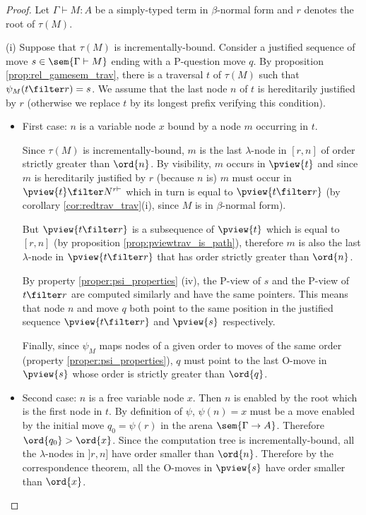 \begin{proof}
Let $\Gamma \vdash M : A$ be a simply-typed term in $\beta$-normal
form and $r$ denotes the root of $\tau(M)$.

\noindent (i) Suppose that $\tau(M)$ is incrementally-bound.
Consider a justified sequence of move $s \in \sem{\Gamma \vdash M}$
ending with a P-question move $q$. By proposition \ref{prop:rel_gamesem_trav},
there is a traversal $t$ of $\tau(M)$ such that $\psi_M (t\filter r) = s$. We assume that the last node $n$ of $t$ is
hereditarily justified by $r$ (otherwise we replace $t$ by its
longest prefix verifying this condition).
\begin{itemize}
\item First case: $n$ is a variable node $x$ bound by a node $m$ occurring in $t$.

Since $\tau(M)$ is incrementally-bound, $m$ is the last
$\lambda$-node in $[r,n]$ of order strictly greater than
$\ord{n}$. By visibility, $m$ occurs in $\pview{t}$ and since
$m$ is hereditarily justified by $r$ (because $n$ is) $m$ must
occur in $\pview{t} \filter N^{r \vdash}$ which in turn is equal
to $\pview{t \filter r}$ (by corollary
\ref{cor:redtrav_trav}(i), since $M$ is in $\beta$-normal form).

But $\pview{t \filter r}$ is a subsequence of
$\pview{t}$ which is equal to $[r,n]$ (by proposition \ref{prop:pviewtrav_is_path}), therefore $m$ is also the last $\lambda$-node in $\pview{t \filter  r}$ that has order strictly greater
than $\ord{n}$.

By property \ref{proper:psi_properties} (iv), the P-view of $s$ and
the P-view of $t \filter r$ are computed similarly and
have the same pointers. This means that node $n$ and  move $q$ both
point to the same position in the justified sequence
$\pview{t\filter r}$ and $\pview{s}$ respectively.

Finally, since $\psi_M$ maps nodes of a given order to moves of the
same order (property \ref{proper:psi_properties}), $q$ must
point to the last O-move in $\pview{s}$ whose order is strictly
greater than $\ord{q}$.


\item  Second case: $n$ is a free variable node $x$. Then $n$ is enabled by the root which is the first node in $t$.
By definition of $\psi$, $\psi(n) = x$ must be a move enabled
by the initial move $q_0 = \psi(r)$ in the arena $\sem{\Gamma
\rightarrow A}$. Therefore $\ord{q_0} > \ord{x}$. Since the
computation tree is incrementally-bound, all the $\lambda$-nodes in
$]r,n]$ have order smaller than $\ord{n}$. Therefore by the
correspondence theorem, all the O-moves in $\pview{s}$ have order
smaller than $\ord{x}$.
\end{itemize}


\end{proof}
